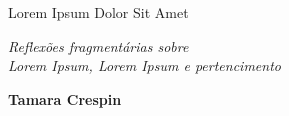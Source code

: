 




\begingroup\thispagestyle{empty}\vspace*{.05\textheight} 

              \formular
              
              \LARGE\noindent
              Lorem Ipsum Dolor Sit Amet

              \smallskip
                      
              \large\noindent\textit{Reflexões fragmentárias sobre\\ 
              Lorem Ipsum, Lorem Ipsum e pertencimento}

              \bigskip  
              
              \Large\noindent\textbf{Tamara Crespin}
              

              \vfill
              
              
              
